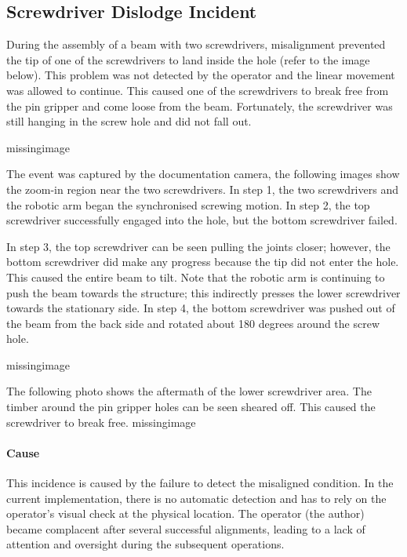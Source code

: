\subsection{Screwdriver Dislodge Incident}
\label{subsection:exploration_4_screwdriver_dislodge_incident}

During the assembly of a beam with two screwdrivers, misalignment prevented the tip of one of the screwdrivers to land inside the hole (refer to the image below). This problem was not detected by the operator and the linear movement was allowed to continue. This caused one of the screwdrivers to break free from the pin gripper and come loose from the beam. Fortunately, the screwdriver was still hanging in the screw hole and did not fall out.

missingimage

The event was captured by the documentation camera, the following images show the zoom-in region near the two screwdrivers. In step 1, the two screwdrivers and the robotic arm began the synchronised screwing motion. In step 2, the top screwdriver successfully engaged into the hole, but the bottom screwdriver failed. 

In step 3, the top screwdriver can be seen pulling the joints closer; however, the bottom screwdriver did make any progress because the tip did not enter the hole. This caused the entire beam to tilt. Note that the robotic arm is continuing to push the beam towards the structure; this indirectly presses the lower screwdriver towards the stationary side. In step 4, the bottom screwdriver was pushed out of the beam from the back side and rotated about 180 degrees around the screw hole. 

missingimage

The following photo shows the aftermath of the lower screwdriver area. The timber around the pin gripper holes can be seen sheared off. This caused the screwdriver to break free.
missingimage

\paragraph{Cause}
This incidence is caused by the failure to detect the misaligned condition. In the current implementation, there is no automatic detection and has to rely on the operator’s visual check at the physical location. 
The operator (the author) became complacent after several successful alignments, leading to a lack of attention and oversight during the subsequent operations.

